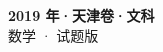 \documentclass[zihao=-4, a4paper]{ctexart}
\begin{document}
\begin{center}
  {\Large\bfseries 2019 年·天津卷·文科}\\[4pt]
  {\large 数学 · 试题版}
\end{center}
\medskip
{}

\end{document}
